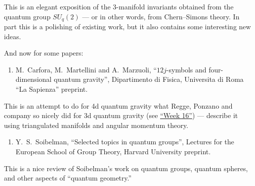 \documentclass[12pt]{article}
\def\tightlist{}
\begin{document}
This is an elegant exposition of the 3-manifold invariants obtained from
the quantum group \(SU_q(2)\) --- or in other words, from Chern--Simons
theory. In part this is a polishing of existing work, but it also
contains some interesting new ideas.

And now for some papers:

\begin{enumerate}
\def\labelenumi{\arabic{enumi})}
\setcounter{enumi}{3}
\tightlist
\item
   M.\  Carfora, M.\ Martellini and A.\
  Marzuoli, ``\(12j\)-symbols and four-dimensional quantum gravity'', 
  Dipartimento di Fisica, Universita di Roma ``La Sapienza'' preprint.
\end{enumerate}
\noindent
This is an attempt to do for 4d quantum gravity what Regge, Ponzano and
company so nicely did for 3d quantum gravity (see
\protect\hyperlink{week16}{``Week 16''}) --- describe it using
triangulated manifolds and angular momentum theory.

\begin{enumerate}
\def\labelenumi{\arabic{enumi})}
\setcounter{enumi}{4}
\tightlist
\item
   Y.\ S.\ Soibelman, ``Selected topics in quantum groups'', 
   Lectures for the European School of Group Theory, Harvard University preprint.
\end{enumerate}
\noindent
This is a nice review of Soibelman's work on quantum groups, quantum
spheres, and other aspects of ``quantum geometry.''
\end{document}
